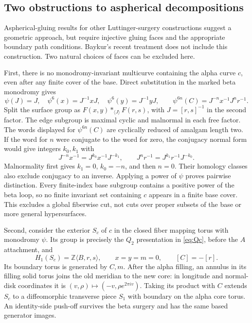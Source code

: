\documentclass[11pt]{amsart}
\theoremstyle{definition}
\theoremstyle{remark}
\newcommand{\Z}{\mathbb Z}
\begin{document}
\subsection{Two obstructions to aspherical decompositions}\label{subsec:cuts}

Aspherical-gluing results for other Luttinger-surgery constructions
suggest a geometric approach, but require injective gluing faces and
the appropriate boundary path conditions. Baykur's recent treatment
\cite[Theorem 3, Lemma 6, and Remark 15]{Bay26} does not include this
construction. Two natural choices of faces can be excluded here.

First, there is no monodromy-invariant multicurve containing the alpha
curve $c$, even after any finite cover of the base. Direct substitution
in the marked beta monodromy gives
\[
 \psi(J)=J,\quad \psi^6(x)=J^{-1}xJ,\quad
 \psi^6(y)=J^{-1}yJ,\qquad
 \psi^{6n}(C)=J^{-n}x^{-1}J^nr^{-1}.
\]
Split the surface group as
$F(x,y)*_{\langle J\rangle}F(r,s)$, with
$J=[r,s]^{-1}$ in the second factor. The edge subgroup is maximal
cyclic and malnormal in each free factor. The words displayed for
$\psi^{6n}(C)$ are cyclically reduced of amalgam length two.
If the word for $n$ were conjugate to the word for zero, the conjugacy
normal form would give integers $k_0,k_1$ with
\[
 J^{-n}x^{-1}=J^{k_0}x^{-1}J^{-k_1},\qquad
 J^nr^{-1}=J^{k_1}r^{-1}J^{-k_0}.
\]
Malnormality first gives $k_1=0$, $k_0=-n$, and then $n=0$.
Their homology classes also exclude conjugacy to an inverse.
Applying a power of $\psi$ proves pairwise distinction. Every
finite-index base subgroup contains a positive power of the beta
loop, so no finite invariant set containing $c$ appears in a finite
base cover. This excludes a global fiberwise cut, not cuts over
proper subsets of the base or more general hypersurfaces.

Second, consider the exterior $S_c$ of $c$ in the closed fiber mapping
torus with monodromy $\psi$. Its group is precisely the $Q_2$ presentation in
\eqref{eq:Qc}, before the $A$ attachment, and
\[
 H_1(S_c)=\Z\langle B,r,s\rangle,
 \qquad x=y=m=0,\qquad [C]=-[r].
\]
Its boundary torus is generated by $C,m$. After the alpha filling,
an annulus in its filling solid torus joins the old meridian to the
new core: in longitude and normal-disk coordinates it is
$(v,\rho)\mapsto(-v,\rho e^{2\pi iv})$. Taking its product with
$C$ extends $S_c$ to a diffeomorphic transverse piece $S_1$ with
boundary on the alpha core torus. An identity-side push-off survives
the beta surgery and has the same based generator images.
\end{document}
